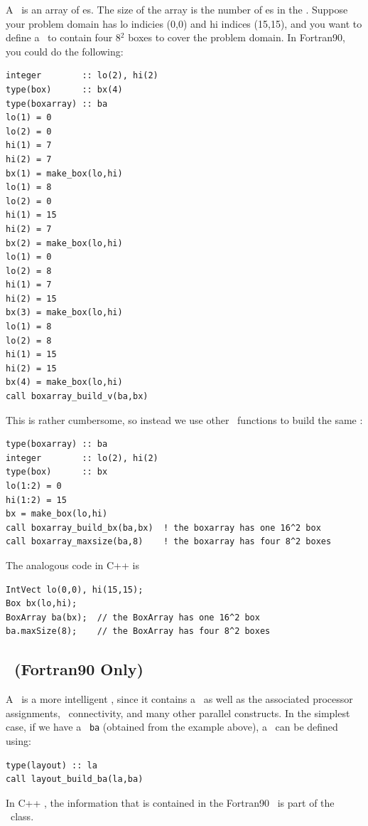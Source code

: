 A \BoxArray\ is an array of \BoxType es.  The size of the array is the 
number of \BoxType es in the \BoxArray.  Suppose your problem domain
has lo indicies (0,0) and hi indices (15,15), and you want to define
a \BoxArray\ to contain four 8$^2$ boxes to cover the problem domain.
In Fortran90, you could do the following:
\begin{lstlisting}[language={[gnu]make},mathescape=false]
integer        :: lo(2), hi(2)
type(box)      :: bx(4)
type(boxarray) :: ba
lo(1) = 0
lo(2) = 0
hi(1) = 7
hi(2) = 7
bx(1) = make_box(lo,hi)
lo(1) = 8
lo(2) = 0
hi(1) = 15
hi(2) = 7
bx(2) = make_box(lo,hi)
lo(1) = 0
lo(2) = 8
hi(1) = 7
hi(2) = 15
bx(3) = make_box(lo,hi)
lo(1) = 8
lo(2) = 8
hi(1) = 15
hi(2) = 15
bx(4) = make_box(lo,hi)
call boxarray_build_v(ba,bx)
\end{lstlisting}
This is rather cumbersome, so instead we use other \BoxLib\ functions to
build the same \BoxArray:
\begin{lstlisting}[language={[gnu]make},mathescape=false]
type(boxarray) :: ba
integer        :: lo(2), hi(2)
type(box)      :: bx
lo(1:2) = 0
hi(1:2) = 15
bx = make_box(lo,hi)
call boxarray_build_bx(ba,bx)  ! the boxarray has one 16^2 box
call boxarray_maxsize(ba,8)    ! the boxarray has four 8^2 boxes
\end{lstlisting}
The analogous code in C++ is
\begin{lstlisting}[language={[gnu]make},mathescape=false]
IntVect lo(0,0), hi(15,15);
Box bx(lo,hi);
BoxArray ba(bx);  // the BoxArray has one 16^2 box
ba.maxSize(8);    // the BoxArray has four 8^2 boxes
\end{lstlisting}

\subsection{\layout\ (Fortran90 Only)}

A \layout\ is a more intelligent \BoxArray, since it contains a \BoxArray\ as well
as the associated processor assignments, \BoxType\ connectivity, and many other
parallel constructs.  In the simplest case, if we have a \BoxArray\ {\tt ba} (obtained
from the example above), a 
\layout\ can be defined using:
\begin{lstlisting}[language={[gnu]make},mathescape=false]
type(layout) :: la
call layout_build_ba(la,ba)
\end{lstlisting}
In C++ \BoxLib, the information that is contained in the Fortran90 \layout\ is part of
the \MultiFab\ class.

